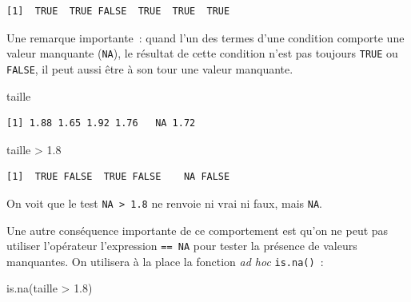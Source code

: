 \documentclass[
  letterpaper,
  DIV=11,
  numbers=noendperiod,
  oneside]{scrreprt}
\newenvironment{Shaded}{\begin{snugshade}}{\end{snugshade}}
\newcommand{\FloatTok}[1]{\textcolor[rgb]{0.68,0.00,0.00}{#1}}
\newcommand{\FunctionTok}[1]{\textcolor[rgb]{0.28,0.35,0.67}{#1}}
\newcommand{\NormalTok}[1]{\textcolor[rgb]{0.00,0.23,0.31}{#1}}
\newcommand{\SpecialCharTok}[1]{\textcolor[rgb]{0.37,0.37,0.37}{#1}}
\begin{document}
\begin{verbatim}
[1]  TRUE  TRUE FALSE  TRUE  TRUE  TRUE
\end{verbatim}

\begin{tcolorbox}[enhanced jigsaw, colbacktitle=quarto-callout-important-color!10!white, opacityback=0, toprule=.15mm, colback=white, coltitle=black, bottomtitle=1mm, toptitle=1mm, titlerule=0mm, rightrule=.15mm, title=\textcolor{quarto-callout-important-color}{\faExclamation}\hspace{0.5em}{Comparaison et valeur manquante}, breakable, bottomrule=.15mm, opacitybacktitle=0.6, arc=.35mm, left=2mm, leftrule=.75mm, colframe=quarto-callout-important-color-frame]

Une remarque importante~: quand l'un des termes d'une condition comporte
une valeur manquante (\texttt{NA}), le résultat de cette condition n'est
pas toujours \texttt{TRUE} ou \texttt{FALSE}, il peut aussi être à son
tour une valeur manquante.

\begin{Shaded}
\begin{Highlighting}[]
\NormalTok{taille}
\end{Highlighting}
\end{Shaded}

\begin{verbatim}
[1] 1.88 1.65 1.92 1.76   NA 1.72
\end{verbatim}

\begin{Shaded}
\begin{Highlighting}[]
\NormalTok{taille }\SpecialCharTok{\textgreater{}} \FloatTok{1.8}
\end{Highlighting}
\end{Shaded}

\begin{verbatim}
[1]  TRUE FALSE  TRUE FALSE    NA FALSE
\end{verbatim}

On voit que le test \texttt{NA\ \textgreater{}\ 1.8} ne renvoie ni vrai
ni faux, mais \texttt{NA}.

Une autre conséquence importante de ce comportement est qu'on ne peut
pas utiliser l'opérateur l'expression \texttt{==\ NA} pour tester la
présence de valeurs manquantes. On utilisera à la place la fonction
\emph{ad hoc} \texttt{is.na()}~:

\begin{Shaded}
\begin{Highlighting}[]
\FunctionTok{is.na}\NormalTok{(taille }\SpecialCharTok{\textgreater{}} \FloatTok{1.8}\NormalTok{)}
\end{Highlighting}
\end{Shaded}


\end{tcolorbox}
\end{document}
